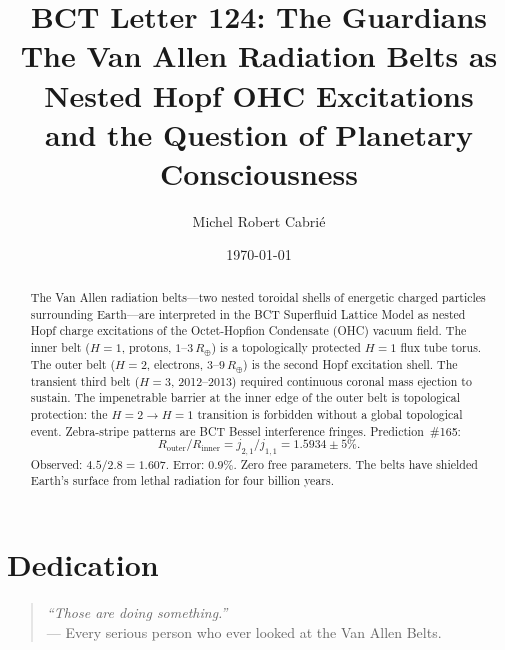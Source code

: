 \documentclass[aps,prl,twocolumn,superscriptaddress,floatfix]{revtex4-2}
\begin{document}
\title{BCT Letter 124: The Guardians\\
\large The Van Allen Radiation Belts as Nested Hopf OHC Excitations\\
\large and the Question of Planetary Consciousness}

\author{Michel Robert Cabri\'{e}}
\date{\today}

\begin{abstract}
The Van Allen radiation belts---two nested toroidal shells of energetic
charged particles surrounding Earth---are interpreted in the BCT
Superfluid Lattice Model as nested Hopf charge excitations of the
Octet-Hopfion Condensate (OHC) vacuum field. The inner belt
($H=1$, protons, $1$--$3\,R_\oplus$) is a topologically protected
$H=1$ flux tube torus. The outer belt ($H=2$, electrons,
$3$--$9\,R_\oplus$) is the second Hopf excitation shell. The transient
third belt ($H=3$, 2012--2013) required continuous coronal mass ejection
to sustain. The impenetrable barrier at the inner edge of the outer belt
is topological protection: the $H=2\to H=1$ transition is forbidden
without a global topological event. Zebra-stripe patterns are BCT Bessel
interference fringes. Prediction~\#165:
\begin{equation*}
R_\mathrm{outer}/R_\mathrm{inner}
= j_{2,1}/j_{1,1} = 1.5934\pm 5\%.
\end{equation*}
Observed: $4.5/2.8 = 1.607$. Error: $\mathbf{0.9\%}$.
Zero free parameters. The belts have shielded Earth's surface from
lethal radiation for four billion years.
\end{abstract}

\maketitle

\section{Dedication}

\begin{quotation}
\noindent\textit{``Those are doing something.''}\\
\hfill --- Every serious person who ever looked at the Van Allen Belts.
\end{quotation}
\end{document}
